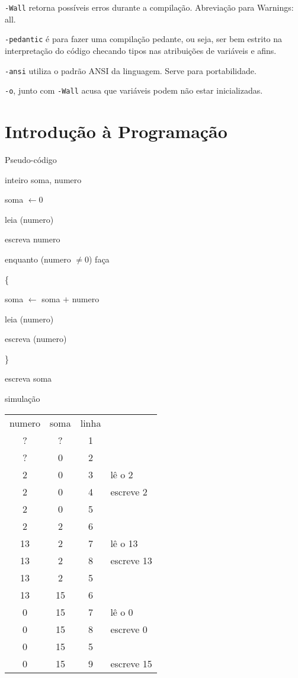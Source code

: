 \documentclass[a4paper]{memoir}
\begin{document}
\verb|-Wall| retorna possíveis erros durante a compilação. Abreviação para Warnings: all.

\verb|-pedantic| é para fazer uma compilação pedante, ou seja, ser bem estrito na interpretação do código checando tipos nas atribuições de variáveis e afins.

\verb|-ansi| utiliza o padrão ANSI da linguagem. Serve para portabilidade.

\verb|-o|, junto com \verb|-Wall| acusa que variáveis podem não estar inicializadas.



\chapter{Introdução à Programação}

\begin{ex}
Pseudo-código

inteiro soma, numero

soma $\leftarrow 0$

leia (numero)

escreva numero

enquanto (numero $\ne 0$) faça

\{

\qquad soma $\leftarrow$ soma $+$ numero

\qquad leia (numero)

\qquad escreva (numero)

\}

escreva soma
\end{ex}

\begin{simu}
simulação

\begin{center}
\begin{tabular}{cccl}
numero & soma & linha & \\
? & ? & 1 & \\
? & 0 & 2 & \\
2 & 0 & 3 & lê o 2\\
2 & 0 & 4 & escreve 2\\
2 & 0 & 5 & \\
2 & 2 & 6 & \\
13 & 2 & 7 & lê o 13\\
13 & 2 & 8 & escreve 13\\
13 & 2 & 5 & \\
13 & 15 & 6 & \\
0 & 15 & 7 & lê o 0\\
0 & 15 & 8 & escreve 0\\
0 & 15 & 5 & \\
0 & 15 & 9 & escreve 15\\
\end{tabular}
\end{center}

\end{simu}
\end{document}
